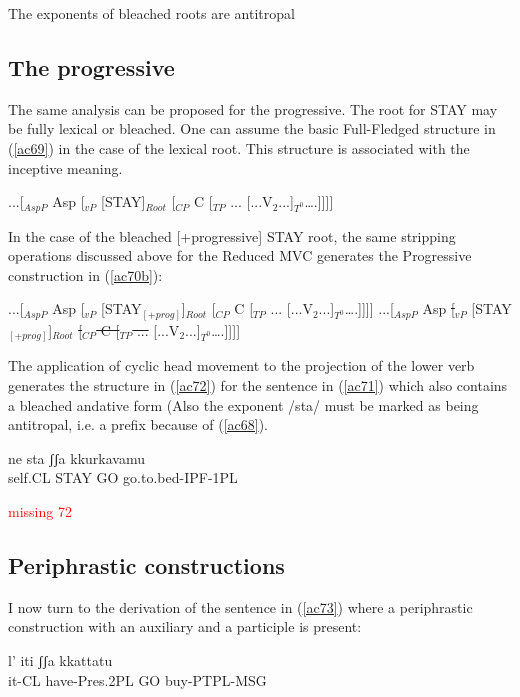 \documentclass[output=paper]{langscibook}
\begin{document}
\ea\label{ac68}
The exponents of bleached roots are antitropal
\z

\subsection{The progressive}

The same analysis can be proposed for the progressive.  The root for STAY may be fully lexical or bleached. One can assume the basic Full-Fledged structure in (\ref{ac69}) in the case of the lexical root.  This structure is associated with the inceptive meaning.

\ea \label{ac69}...[$_{AspP}$ Asp [$_{vP}$ [STAY]$_{Root}$ [$_{CP}$ C [$_{TP}$ ... [...V$_2$...]$_{T^0}$….]]]]
\z

In the case of the bleached [+progressive] STAY root, the same stripping operations discussed above for the Reduced MVC generates the Progressive construction in (\ref{ac70b}):

\ea \label{ac70}
    \ea \label{ac70a}...[$_{AspP}$ Asp [$_{vP}$ [STAY$_{[+prog]}$]$_{Root}$ [$_{CP}$ C [$_{TP}$ ... [...V$_2$...]$_{T^0}$….]]]]
    \ex \label{ac70b}...[$_{AspP}$ Asp \sout{[$_{vP}$} [STAY$_{[+prog]}$]$_{Root}$ \sout{[$_{CP}$ C [$_{TP}$ ...} [...V$_2$...]$_{T^0}$….]]]]
    \z
\z

The application of cyclic head movement to the projection of the lower verb generates the structure in (\ref{ac72}) for the sentence in (\ref{ac71}) which also contains a bleached andative form (Also the exponent /sta/ must be marked as being antitropal, i.e. a prefix because of (\ref{ac68}). 

\ea \label{ac71}
    \gll ne     sta    ʃʃa  kkurkavamu\\
   self.CL STAY GO  go.to.bed-IPF-1PL\\
\z

\ea
\textcolor{red}{missing 72}
\z

\subsection{Periphrastic constructions}

I now turn to the derivation of the sentence in (\ref{ac73}) where a periphrastic construction with an auxiliary and a participle is present:

\ea\label{ac73}
\gll l’    iti         ʃʃa   kkattatu\\
   it-CL  have-Pres.2PL    GO  buy-PTPL-MSG\\
\z
\end{document}
